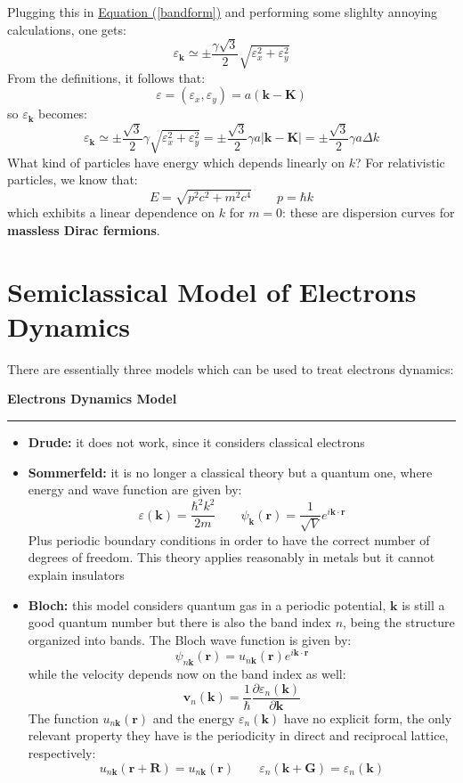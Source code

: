 \documentclass[10.75pt,a4paper,openright,bottom=2cm]{article}
\renewcommand{\Vec}[1]{\boldsymbol{#1}}
\renewcommand{\refeq}[1]{\hyperref[#1]{Equation (\ref{#1})}}
\begin{document}
Plugging this in \refeq{bandform} and performing some slighlty annoying calculations, one gets:
\[
\varepsilon_{\Vec{k}}\simeq\pm\frac{\gamma\sqrt{3}}{2}\sqrt{\varepsilon_x^2+\varepsilon_y^2}
\]
From the definitions, it follows that:
\[
\varepsilon=(\varepsilon_x,\varepsilon_y)=a(\Vec{k}-\Vec{K})
\]
so $\varepsilon_{\Vec{k}}$ becomes:
\[
\varepsilon_{\Vec{k}}\simeq\pm\frac{\sqrt{3}}{2}\gamma\sqrt{\varepsilon_x^2+\varepsilon_y^2}=\pm\frac{\sqrt{3}}{2}\gamma a|\Vec{k}-\Vec{K}|=\pm\frac{\sqrt{3}}{2}\gamma a\Delta k
\]
What kind of particles have energy which depends linearly on $k$? For relativistic particles, we know that:
\[
E=\sqrt{p^2c^2+m^2c^4} \qquad p=\hbar k
\]
which exhibits a linear dependence on $k$ for $m=0$: these are dispersion curves for \textbf{massless Dirac fermions}.
\newpage
\section{Semiclassical Model of Electrons Dynamics}
There are essentially three models which can be used to treat electrons dynamics: 
\begin{mybox}
\textbf{Electrons Dynamics Model}
\hrule
\begin{itemize}
    \item \textbf{Drude:} it does not work, since it considers classical electrons
    \item \textbf{Sommerfeld:} it is no longer a classical theory but a quantum one, where energy and wave function are given by:
    \[
    \varepsilon(\Vec{k})=\frac{\hbar^2k^2}{2m} \qquad \psi_{\Vec{k}}(\Vec{r})=\frac{1}{\sqrt{V}}e^{i\Vec{k}\cdot\Vec{r}}
    \]
    Plus periodic boundary conditions in order to have the correct number of degrees of freedom. This theory applies reasonably in metals but it cannot explain insulators
    \item \textbf{Bloch:} this model considers quantum gas in a periodic potential, $\Vec{k}$ is still a good quantum number but there is also the band index $n$, being the structure organized into bands. The Bloch wave function is given by:
    \[
    \psi_{n\Vec{k}}(\Vec{r})=u_{n\Vec{k}}(\Vec{r})e^{i\Vec{k}\cdot\Vec{r}}
    \]
    while the velocity depends now on the band index as well:
    \[
    \Vec{v}_n(\Vec{k})=\frac{1}{\hbar}\frac{\partial \varepsilon_n(\Vec{k})}{\partial\Vec{k}}
    \]
    The function $u_{n\Vec{k}}(\Vec{r})$ and the energy $\varepsilon_n(\Vec{k})$ have no explicit form, the only relevant property they have is the periodicity in direct and reciprocal lattice, respectively:
    \[
    u_{n\Vec{k}}(\Vec{r}+\Vec{R})=u_{n\Vec{k}}(\Vec{r}) \qquad \varepsilon_n(\Vec{k}+\Vec{G})=\varepsilon_n(\Vec{k})
    \]
\end{itemize}
\end{mybox}\noindent
\end{document}
